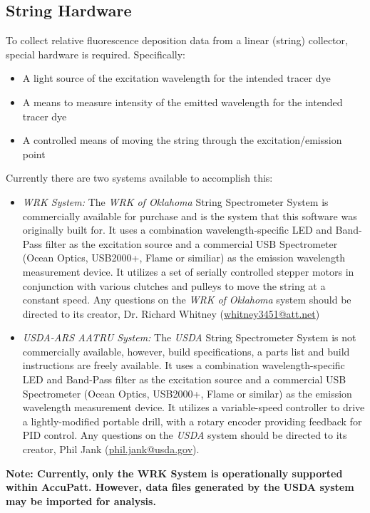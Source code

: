 \documentclass[10pt,letterpaper,titlepage]{article}
\begin{document}
    \subsection{String Hardware}
    To collect relative fluorescence deposition data from a linear (string) collector, special hardware is required. Specifically: 
    \begin{itemize}
        \item A light source of the excitation wavelength for the intended tracer dye
        \item A means to measure intensity of the emitted wavelength for the intended tracer dye
        \item A controlled means of moving the string through the excitation/emission point
    \end{itemize}
    Currently there are two systems available to accomplish this:
    \begin{itemize}
        \item{\textit{WRK System:}} The \textit{WRK of Oklahoma} String Spectrometer System is commercially available for purchase and is the system that this software was originally built for. It uses a combination wavelength-specific LED and Band-Pass filter as the excitation source and a commercial USB Spectrometer (Ocean Optics, USB2000+, Flame or similiar) as the emission wavelength measurement device. It utilizes a set of serially controlled stepper motors in conjunction with various clutches and pulleys to move the string at a constant speed. Any questions on the \textit{WRK of Oklahoma} system should be directed to its creator, Dr. Richard Whitney (\href{mailto:whitney3451@att.net}{whitney3451@att.net})
        \item{\textit{USDA-ARS AATRU System:}} The \textit{USDA} String Spectrometer System is not commercially available, however, build specifications, a parts list and build instructions are freely available. It uses a combination wavelength-specific LED and Band-Pass filter as the excitation source and a commercial USB Spectrometer (Ocean Optics, USB2000+, Flame or similar) as the emission wavelength measurement device. It utilizes a variable-speed controller to drive a lightly-modified portable drill, with a rotary encoder providing feedback for PID control. Any questions on the \textit{USDA} system should be directed to its creator, Phil Jank (\href{mailto:phil.jank@usda.gov}{phil.jank@usda.gov}).
    \end{itemize}
    \textbf{\color{red}Note: Currently, only the WRK System is operationally supported within AccuPatt. However, data files generated by the USDA system may be imported for analysis.\color{black}}
\end{document}
